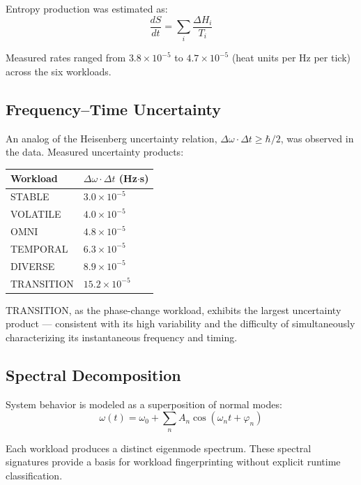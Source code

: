 Entropy production was estimated as:
\[
  \frac{dS}{dt} = \sum_i \frac{\Delta H_i}{T_i}
\]

Measured rates ranged from $3.8 \times 10^{-5}$ to $4.7 \times 10^{-5}$
(heat units per Hz per tick) across the six workloads.

\subsection{Frequency--Time Uncertainty}

An analog of the Heisenberg uncertainty relation,
$\Delta\omega \cdot \Delta t \geq \hbar/2$,
was observed in the data. Measured uncertainty products:

\begin{center}
\begin{tabular}{ll}
\toprule
Workload    & $\Delta\omega \cdot \Delta t$ (Hz$\cdot$s) \\
\midrule
STABLE      & $3.0 \times 10^{-5}$ \\
VOLATILE    & $4.0 \times 10^{-5}$ \\
OMNI        & $4.8 \times 10^{-5}$ \\
TEMPORAL    & $6.3 \times 10^{-5}$ \\
DIVERSE     & $8.9 \times 10^{-5}$ \\
TRANSITION  & $15.2 \times 10^{-5}$ \\
\bottomrule
\end{tabular}
\end{center}

TRANSITION, as the phase-change workload, exhibits the largest
uncertainty product — consistent with its high variability and the
difficulty of simultaneously characterizing its instantaneous frequency
and timing.

\subsection{Spectral Decomposition}

System behavior is modeled as a superposition of normal modes:
\[
  \omega(t) = \omega_0 + \sum_n A_n \cos(\omega_n t + \varphi_n)
\]

Each workload produces a distinct eigenmode spectrum. These spectral
signatures provide a basis for workload fingerprinting without explicit
runtime classification.

